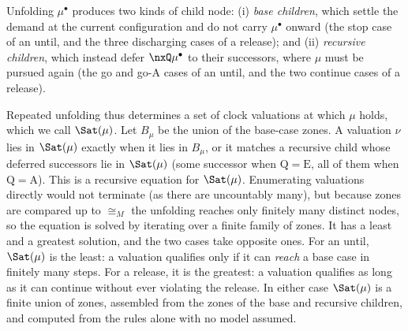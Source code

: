

Unfolding $\mu^\bullet$ produces two kinds of child node: (i) \emph{base children}, which settle the demand at the current configuration and do not carry $\mu^\bullet$ onward (the stop case of an until, and the three discharging cases of a release); and (ii) \emph{recursive children}, which instead defer $\nxQ\mu^\bullet$ to their successors, where $\mu$ must be pursued again (the go and go-A cases of an until, and the two continue cases of a release). 



Repeated unfolding thus determines a set of clock valuations at which $\mu$ holds, which we call $\Sat(\mu)$. Let $B_\mu$ be the union of the base-case zones. A valuation $\nu$ lies in $\Sat(\mu)$ exactly when it lies in $B_\mu$, or it matches a recursive child whose deferred successors lie in $\Sat(\mu)$ (some successor when $\mathrm{Q}=\mathrm{E}$, all of them when $\mathrm{Q}=\mathrm{A}$). This is a recursive equation for $\Sat(\mu)$. Enumerating valuations directly would not terminate (as there are uncountably many), but because zones are compared up to $\cong_M$ the unfolding reaches only finitely many distinct nodes, so the equation is solved by iterating over a finite family of zones. It has a least and a greatest solution, and the two cases take opposite ones. For an until, $\Sat(\mu)$ is the least: a valuation qualifies only if it can \emph{reach} a base case in finitely many steps. For a release, it is the greatest: a valuation qualifies as long as it can continue without ever violating the release. In either case $\Sat(\mu)$ is a finite union of zones, assembled from the zones of the base and recursive children, and computed from the rules alone with no model assumed.


